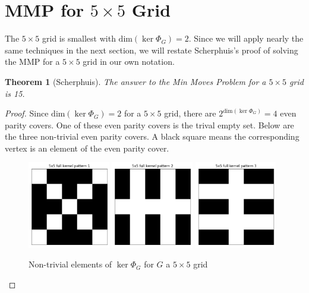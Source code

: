 \documentclass[a4paper]{article}
\newtheorem{theorem}{Theorem}
\renewcommand{\dim}[1]{\text{dim}\left( #1 \right)}
\begin{document}
	\section{MMP for $5 \times 5$ Grid}
	The $5 \times 5$ grid is smallest with $\dim{\ker{\Phi_G}} = 2$.
	Since we will apply nearly the same techniques in the next section, we will restate Scherphuis's proof of solving the MMP for a $5 \times 5$ grid in our own notation.
	\begin{theorem}[Scherphuis]\label{min-moves-problem-5x5}
		The answer to the Min Moves Problem for a $5 \times 5$ grid is 15.
	\end{theorem}
	\begin{proof}
		Since $\dim{\ker{\Phi_G}} = 2$ for a $5 \times 5$ grid, there are $2^{\dim{\ker{\Phi_G}}} = 4$ even parity covers.
		One of these even parity covers is the trival empty set.
		Below are the three non-trivial even parity covers.
		A black square means the corresponding vertex is an element of the even parity cover.
		
		\begin{figure}[H]
			\centering
			\includegraphics[width=0.32\textwidth]{../../code/serialization/kernels/5x5/full/5x5_kernel_full_1.png}
			\includegraphics[width=0.32\textwidth]{../../code/serialization/kernels/5x5/full/5x5_kernel_full_2.png}
			\includegraphics[width=0.32\textwidth]{../../code/serialization/kernels/5x5/full/5x5_kernel_full_3.png}
			\caption{Non-trivial elements of $\ker{\Phi_G}$ for $G$ a $5 \times 5$ grid}
		\end{figure}
	

\end{proof}
\end{document}

